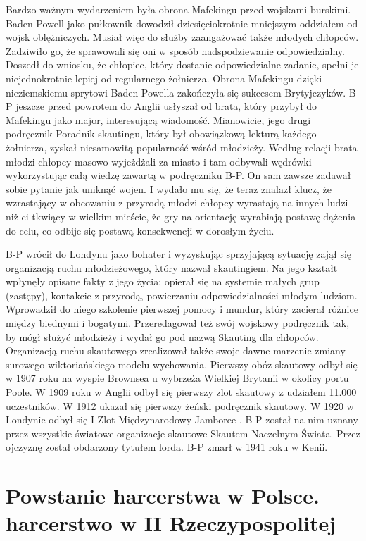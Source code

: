 Bardzo ważnym wydarzeniem była obrona Mafekingu przed wojskami burskimi. Baden-Powell jako pułkownik dowodził dziesięciokrotnie mniejszym oddziałem od wojsk oblężniczych. Musiał więc do służby zaangażować także młodych chłopców. Zadziwiło go, że sprawowali się oni w sposób nadspodziewanie odpowiedzialny. Doszedł do wniosku, że chłopiec, który dostanie odpowiedzialne zadanie, spełni je niejednokrotnie lepiej od regularnego żołnierza. Obrona Mafekingu dzięki nieziemskiemu sprytowi Baden-Powella zakończyła się sukcesem Brytyjczyków. B-P jeszcze przed powrotem do Anglii usłyszał od brata, który przybył do Mafekingu jako major, interesującą wiadomość. Mianowicie, jego drugi podręcznik Poradnik skautingu, który był obowiązkową lekturą każdego żołnierza, zyskał niesamowitą popularność wśród młodzieży. Według relacji brata młodzi chłopcy masowo wyjeżdżali za miasto i tam odbywali wędrówki wykorzystując całą wiedzę zawartą w podręczniku B-P. On sam zawsze zadawał sobie pytanie jak uniknąć wojen. I wydało mu się, że teraz znalazł klucz, że wzrastający w obcowaniu z przyrodą młodzi chłopcy wyrastają na innych ludzi niż ci tkwiący w wielkim mieście, że gry na orientację wyrabiają postawę dążenia do celu, co odbije się postawą konsekwencji w dorosłym życiu.

B-P wrócił do Londynu jako bohater i wyzyskując sprzyjającą sytuację zajął się organizacją ruchu młodzieżowego, który nazwał skautingiem. Na jego kształt wpłynęły opisane fakty z jego życia: opierał się na systemie małych grup (zastępy), kontakcie z przyrodą, powierzaniu odpowiedzialności młodym ludziom. Wprowadził do niego szkolenie pierwszej pomocy i mundur, który zacierał różnice między biednymi i bogatymi. Przeredagował też swój wojskowy podręcznik tak, by mógł służyć młodzieży i wydał go pod nazwą Skauting dla chłopców. Organizacją ruchu skautowego zrealizował także swoje dawne marzenie zmiany surowego wiktoriańskiego modelu wychowania. Pierwszy obóz skautowy odbył się w 1907 roku na wyspie Brownsea u wybrzeża Wielkiej Brytanii w okolicy portu Poole. W 1909 roku w Anglii odbył się pierwszy zlot skautowy z udziałem 11.000 uczestników. W 1912 ukazał się pierwszy żeński podręcznik skautowy. W 1920 w Londynie odbył się I Zlot Międzynarodowy Jamboree . B-P został na nim uznany przez wszystkie światowe organizacje skautowe Skautem Naczelnym Świata. Przez ojczyznę został obdarzony tytułem lorda. B-P zmarł w 1941 roku w Kenii. 

\section{Powstanie harcerstwa w Polsce. harcerstwo w II Rzeczypospolitej}

